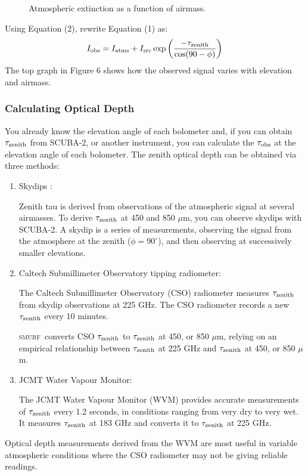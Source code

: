 \documentclass[twoside,11pt]{article}
\renewcommand{\_}{\texttt{\symbol{95}}}
\newcommand{\SMURF}{\textsc{smurf}}
\begin{document}
\begin{figure}
\caption{Atmospheric extinction as a function of airmass.}
\end{figure}

Using Equation (2), rewrite Equation (1) as:
\begin{equation}
I_{\rm obs} = I_{\rm atms} + I_{\rm src} \exp \left( 
\frac{-\tau_{\rm zenith}}{\cos(90-\phi)}\right)
\end{equation}
The top graph in Figure 6 shows how the observed signal varies with elevation
and airmass.

\subsubsection{Calculating Optical Depth}

You already know the elevation angle of each bolometer and, if you can
obtain $\tau_{\rm zenith}$ from SCUBA-2, or another instrument, you
can calculate the $\tau_{\rm obs}$ at the elevation angle of each
bolometer. The zenith optical depth can be obtained via three methods:
\begin{enumerate}
\item Skydips :

Zenith tau is derived from observations of the atmospheric signal at
several airmasses. To derive $\tau_{\rm zenith}$ at 450 and 850
$\mu$m, you can observe skydips with SCUBA-2.  A skydip is a series of
measurements, observing the signal from the atmosphere at the zenith
($\phi = 90^\circ$), and then observing at successively smaller
elevations.

\item Caltech Submillimeter Observatory tipping radiometer:

The Caltech Submillimeter Observatory (CSO) radiometer measures
$\tau_{\rm zenith}$ from skydip observations at 225 GHz. The CSO
radiometer records a new $\tau_{\rm zenith}$ every 10 minutes.

\SMURF\ converts CSO $\tau_{\rm zenith}$ to $\tau_{\rm zenith}$ at 450,
or 850 $\mu$m, relying on an empirical relationship between $\tau_{\rm
  zenith}$ at 225 GHz and $\tau_{\rm zenith}$ at 450, or 850 $\mu$m.

\item JCMT Water Vapour Monitor:

The JCMT Water Vapour Monitor (WVM) provides accurate measurements of
$\tau_{\rm zenith}$ every 1.2 seconds, in conditions ranging from very
dry to very wet. It measures $\tau_{\rm zenith}$ at 183 GHz and
converts it to $\tau_{\rm zenith}$ at 225 GHz.

\end{enumerate}
Optical depth measurements derived from the WVM are most useful in
variable atmospheric conditions where the CSO radiometer may not be
giving reliable readings.
\end{document}
